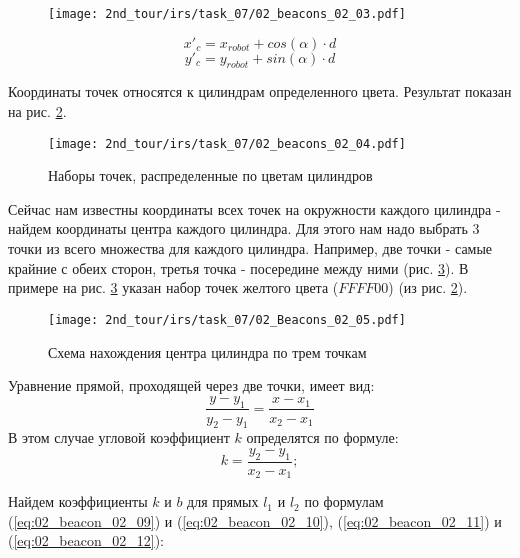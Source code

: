 \begin{figure}[h!]
	\centering
	\texttt{[image: 2nd\_tour/irs/task\_07/02\_beacons\_02\_03.pdf]}
	\caption{}
	\label{fig:02_beacons_02_03}
\end{figure}

\begin{equation}
x'_c = x_{robot} + cos(\alpha) \cdot d
\label{eq:02_beacon_02_05}
\end{equation}
\begin{equation}
y'_c = y_{robot} + sin(\alpha) \cdot d
\label{eq:02_beacon_02_06}
\end{equation}

Координаты точек относятся к цилиндрам определенного цвета. Результат показан на рис. \ref{fig:02_beacons_02_04}.

\begin{figure}[h!]
	\centering
	\texttt{[image: 2nd\_tour/irs/task\_07/02\_beacons\_02\_04.pdf]}
	\caption{Наборы точек, распределенные по цветам цилиндров}
	\label{fig:02_beacons_02_04}
\end{figure}


Сейчас нам известны координаты всех точек на окружности каждого цилиндра - найдем координаты центра каждого цилиндра.
Для этого нам надо выбрать 3 точки из всего множества для каждого цилиндра. Например, две точки - самые крайние с обеих сторон, третья точка - посередине между ними (рис. \ref{fig:02_beacons_02_05}). В примере на рис. \ref{fig:02_beacons_02_05} указан набор точек желтого цвета ($FFFF00$) (из рис. \ref{fig:02_beacons_02_04}).

\begin{figure}[h]
	\centering
	\texttt{[image: 2nd\_tour/irs/task\_07/02\_Beacons\_02\_05.pdf]}
	\caption{Схема нахождения центра цилиндра по трем точкам}
	\label{fig:02_beacons_02_05}
\end{figure}

Уравнение прямой, проходящей через две точки, имеет вид:
\begin{equation*}
\frac{y-y_1}{y_2-y_1} = \frac{x-x_1}{x_2-x_1}
\end{equation*}
В этом случае угловой коэффициент $k$ определятся по формуле:
\begin{equation*}
k = \frac{y_2-y_1}{x_2-x_1};
\end{equation*}

Найдем коэффициенты $k$ и $b$ для прямых $l_1$ и $l_2$ по формулам (\ref{eq:02_beacon_02_09}) и (\ref{eq:02_beacon_02_10}), (\ref{eq:02_beacon_02_11}) и (\ref{eq:02_beacon_02_12}):

